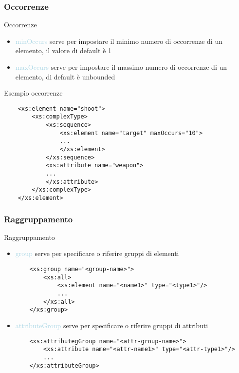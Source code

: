 \documentclass{beamer}
\begin{document}
	\subsubsection{Occorrenze}
	\begin{frame}[containsverbatim]{Occorrenze}
	\begin{itemize}
	\item \textcolor{lightblue}{minOccurs} serve per impostare il minimo numero di occorrenze di un elemento, il valore di default è \textcolor{mauve}{1}\bigskip
	\item \textcolor{lightblue}{maxOccurs} serve per impostare il massimo numero di occorrenze di un elemento, di default è \textcolor{mauve}{unbounded}
	\end{itemize}
	\end{frame}
	\begin{frame}[containsverbatim]
	\begin{block}{Esempio occorrenze}
	\begin{lstlisting}
	<xs:element name="shoot">
		<xs:complexType>
			<xs:sequence>
				<xs:element name="target" maxOccurs="10">
				...
				</xs:element>
			</xs:sequence>
			<xs:attribute name="weapon">
			...
			</xs:attribute>
		</xs:complexType>
	</xs:element>
	\end{lstlisting}
	\end{block}
	\end{frame}
	\subsubsection{Raggruppamento}
	\begin{frame}[containsverbatim]{Raggruppamento}
	\begin{itemize}
	\item \textcolor{lightblue}{group} serve per specificare o riferire gruppi di elementi
	\begin{lstlisting}
	<xs:group name="<group-name>">
		<xs:all>
			<xs:element name="<name1>" type="<type1>"/>
			...
		</xs:all>
	</xs:group>
	\end{lstlisting}
	\item \textcolor{lightblue}{attributeGroup} serve per specificare o riferire gruppi di attributi
	\begin{lstlisting}
	<xs:attributegGroup name="<attr-group-name>">
		<xs:attribute name="<attr-name1>" type="<attr-type1>"/>
		...
	</xs:attributeGroup>
	\end{lstlisting}
	\end{itemize}
	\end{frame}
	
\end{document}
